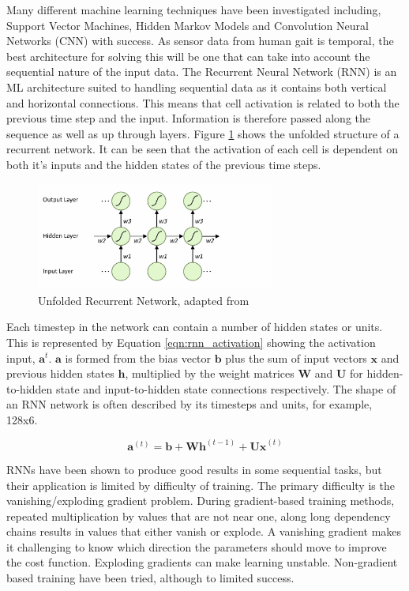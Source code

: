 \documentclass[sensors,article,submit,moreauthors,pdftex]{Definitions/mdpi}
\begin{document}
Many different machine learning techniques have been investigated including, Support Vector Machines, Hidden Markov Models and Convolution Neural Networks (CNN) with success\cite{Labarriere2020}. As sensor data from human gait is temporal, the best architecture for solving this will be one that can take into account the sequential nature of the input data. The Recurrent Neural Network (RNN) is an ML architecture suited to handling sequential data as it contains both vertical and horizontal connections. This means that cell activation is related to both the previous time step and the input. Information is therefore passed along the sequence as well as up through layers. Figure \ref{fig:rnn_structure} shows the unfolded structure of a recurrent network. It can be seen that the activation of each cell is dependent on both it's inputs and the hidden states of the previous time steps.

\begin{figure}[!hbt]
    \centering
    \includegraphics[width=0.7\textwidth]{Figures/lstm/rnn_structure.jpg}
    \caption{Unfolded Recurrent Network, adapted from\cite{Graves2012}}
    \label{fig:rnn_structure}
\end{figure}

Each timestep in the network can contain a number of hidden states or units. This is represented by Equation \ref{eqn:rnn_activation} showing the activation input, $\mathbf{a}^t$. $\mathbf{a}$ is formed from the bias vector $\mathbf{b}$ plus the sum of input vectors $\mathbf{x}$ and previous hidden states $\mathbf{h}$, multiplied by the weight matrices $\mathbf{W}$ and $\mathbf{U}$ for hidden-to-hidden state and input-to-hidden state connections respectively.\cite{Goodfellow2015} The shape of an RNN network is often described by its timesteps and units, for example, 128x6.

\begin{equation}
    \mathbf{a}^{(t)} = \mathbf{b} + \mathbf{Wh}^{(t-1)} + \mathbf{Ux}^{(t)}
    \label{eqn:rnn_activation}
\end{equation}

RNNs have been shown to produce good results in some sequential tasks, but their application is limited by difficulty of training. The primary difficulty is the vanishing/exploding gradient problem. During gradient-based training methods, repeated multiplication by values that are not near one, along long dependency chains results in values that either vanish or explode. A vanishing gradient makes it challenging to know which direction the parameters should move to improve the cost function. Exploding gradients can make learning unstable. Non-gradient based training have been tried, although to limited success. \cite{Graves2012, Goodfellow2015}
\end{document}

